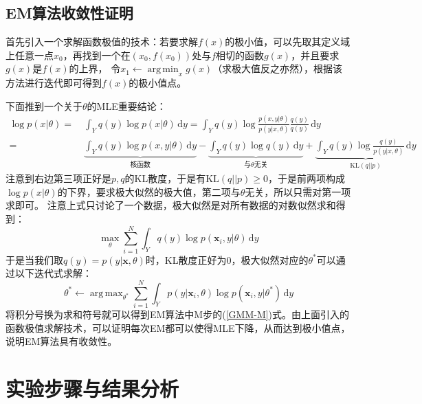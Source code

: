 \documentclass[12pt, a4paper, oneside]{ctexart}
\DeclareMathOperator*{\argmax}{arg\,max}  %
\DeclareMathOperator*{\argmin}{arg\,min}  %
\let\geq=\geqslant %
\def\bd{\boldsymbol}        %
\def\d{\mathrm{d}}          %
\begin{document}
\subsection{EM算法收敛性证明}
首先引入一个求解函数极值的技术：若要求解$f(x)$的极小值，可以先取其定义域上任意一点$x_0$，再找到一个在$(x_0,f(x_0))$处与$f$相切的函数$g(x)$，并且要求$g(x)$是$f(x)$的上界，
令$x_1\gets \argmin_{x}g(x)$（求极大值反之亦然），根据该方法进行迭代即可得到$f(x)$的极小值点。

下面推到一个关于$\theta$的MLE重要结论：
\begin{align*}
\log p(x|\theta) =&\ \int_Yq(y)\log p(x|\theta)\,\mathrm{d}y = \int_Yq(y)\log\frac{p(x,y|\theta)}{p(y|x,\theta)}\frac{q(y)}{q(y)}\,\mathrm{d}y\\
=&\ \underbrace{\int_Yq(y)\log p(x,y|\theta)\,\mathrm{d}y}_{\text{核函数}} - \underbrace{\int_Yq(y)\log q(y)\,\mathrm{d}y}_{\text{与}\theta\text{无关}} + \underbrace{\int_Y q(y)\log\frac{q(y)}{p(y|x,\theta)}\,\mathrm{d}y}_{\text{KL}(q||p)}
\end{align*}
注意到右边第三项正好是$p,q$的KL散度，于是有$\text{KL}(q||p) \geq 0$，于是前两项构成$\log p(x|\theta)$的下界，要求极大似然的极大值，第二项与$\theta$无关，所以只需对第一项求即可。
注意上式只讨论了一个数据，极大似然是对所有数据的对数似然求和得到：
\begin{equation*}
    \max_{\theta}\sum_{i=1}^N\int_Yq(y)\log p(\bd{x}_i,y|\theta)\,\d y
\end{equation*}
于是当我们取$q(y) = p(y|\bd{x},\theta)$时，KL散度正好为$0$，极大似然对应的$\theta^*$可以通过以下迭代式求解：
\begin{equation*}
    \theta^*\gets\argmax_{\theta^*}\sum_{i=1}^N\int_Yp(y|\bd{x}_i,\theta)\log p(\bd{x}_i,y|\theta^*)\,\d y
\end{equation*}
将积分号换为求和符号就可以得到EM算法中M步的(\ref{GMM-M})式。由上面引入的函数极值求解技术，可以证明每次EM都可以使得MLE下降，从而达到极小值点，说明EM算法具有收敛性。

\clearpage
\section{实验步骤与结果分析}
\end{document}
